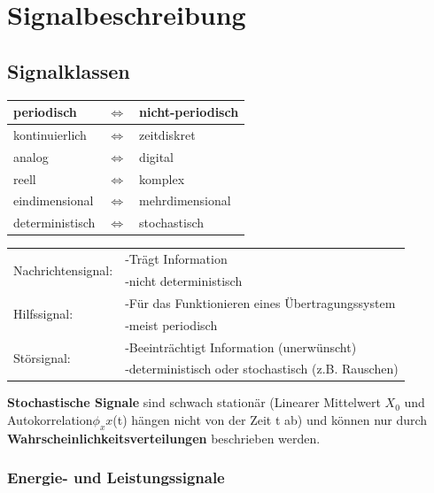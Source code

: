\section{Signalbeschreibung }
	\renewcommand{\arraystretchOriginal}{1}
	
	\subsection{Signalklassen }
	
	\begin{minipage}[t]{0.37\textwidth}
		\begin{tabular}{|l|c|l|}
		\hline 
		periodisch & $\Longleftrightarrow$ & nicht-periodisch \\ 
		\hline 
		kontinuierlich & $\Longleftrightarrow$ & zeitdiskret \\ 
		\hline 
		analog & $\Longleftrightarrow$ & digital \\ 
		\hline 
		reell & $\Longleftrightarrow$ & komplex \\ 
		\hline 
		eindimensional & $\Longleftrightarrow$ & mehrdimensional \\ 
		\hline 
		deterministisch & $\Longleftrightarrow$ & stochastisch \\ 
		\hline 
		\end{tabular}
	\end{minipage}
	\begin{minipage}[t]{0.2\textwidth}
		\begin{tabular}{|l|l|}
			\hline \multirow{2}{*}{Nachrichtensignal:}&-Trägt Information\\
			 &-nicht deterministisch\\
			 \hline 
			 \multirow{2}{*}{Hilfssignal:}&-Für das Funktionieren eines Übertragungssystem\\
		 	&-meist periodisch\\
		 	\hline
		 	\multirow{2}{*}{Störsignal:}&-Beeinträchtigt Information (unerwünscht)\\
	 		&-deterministisch oder stochastisch (z.B. Rauschen)\\
 			\hline
		\end{tabular}
	\end{minipage}

	\textbf{Stochastische Signale} sind schwach stationär (Linearer Mittelwert ${X_0}$ und Autokorrelation${\phi_xx}$(t) hängen nicht
	von der Zeit t ab) und können nur durch \textbf{Wahrscheinlichkeitsverteilungen} beschrieben werden.
		\subsubsection{Energie- und Leistungssignale }
		

